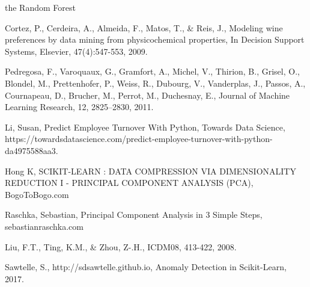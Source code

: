 \documentclass[12pt,preprint]{aastex61}
\begin{document}
the Random Forest %


\begin{thebibliography}{}

 Cortez, P., Cerdeira, A.,
  Almeida, F., Matos, T., \& Reis, J., Modeling wine preferences by
  data mining from physicochemical properties, In Decision Support
  Systems, Elsevier, 47(4):547-553, 2009.


 Pedregosa, F.,
  Varoquaux, G., Gramfort, A., Michel, V., Thirion, B., Grisel, O.,
  Blondel, M.,  Prettenhofer, P., Weiss, R., Dubourg, V., Vanderplas, J.,
  Passos, A., Cournapeau, D., Brucher, M., Perrot, M., Duchesnay, E.,
  Journal of Machine Learning Research, 12, 2825--2830, 2011.


 Li, Susan, Predict Employee Turnover With Python,
  Towards Data Science, https://towardsdatascience.com/predict-employee-turnover-with-python-da4975588aa3.

 Hong K, SCIKIT-LEARN : DATA COMPRESSION VIA DIMENSIONALITY REDUCTION I - PRINCIPAL COMPONENT ANALYSIS (PCA), BogoToBogo.com

 Raschka, Sebastian, Principal Component Analysis
in 3 Simple Steps, sebastianraschka.com

 Liu, F.T., Ting, K.M.,
  \& Zhou, Z-.H., ICDM08, 413-422, 2008.

 Sawtelle, S., http://sdsawtelle.github.io,
  Anomaly Detection in Scikit-Learn, 2017.
  

\end{thebibliography}
\end{document}
